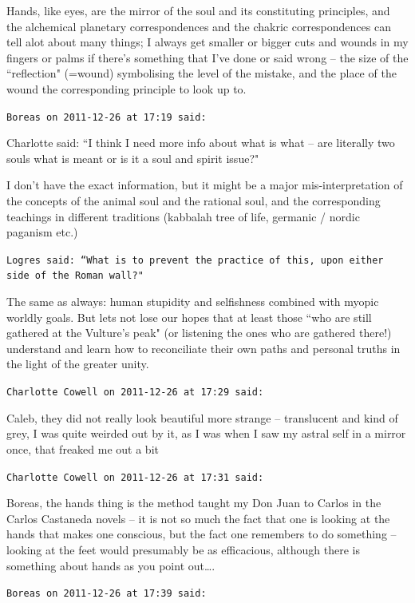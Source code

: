 \begin{footnotesize}
\begin{sffamily}
Hands, like eyes, are the mirror of the soul and its constituting principles, and the alchemical planetary correspondences and the chakric correspondences can tell alot about many things; I always get smaller or bigger cuts and wounds in my fingers or palms if there's something that I've done or said wrong – the size of the ``reflection" (=wound) symbolising the level of the mistake, and the place of the wound the corresponding principle to look up to.


\hfill

\texttt{Boreas on 2011-12-26 at 17:19 said: }

Charlotte said: ``I think I need more info about what is what – are literally two souls what is meant or is it a soul and spirit issue?"

I don't have the exact information, but it might be a major mis-interpretation of the concepts of the animal soul and the rational soul, and the corresponding teachings in different traditions (kabbalah tree of life, germanic / nordic paganism etc.)

\texttt{Logres said: ``What is to prevent the practice of this, upon either side of the Roman wall?"}

The same as always: human stupidity and selfishness combined with myopic worldly goals. But lets not lose our hopes that at least those ``who are still gathered at the Vulture's peak" (or listening the ones who are gathered there!) understand and learn how to reconciliate their own paths and personal truths in the light of the greater unity.


\hfill

\texttt{Charlotte Cowell on 2011-12-26 at 17:29 said: }

Caleb, they did not really look beautiful more strange – translucent and kind of grey, I was quite weirded out by it, as I was when I saw my astral self in a mirror once, that freaked me out a bit


\hfill

\texttt{Charlotte Cowell on 2011-12-26 at 17:31 said: }

Boreas, the hands thing is the method taught my Don Juan to Carlos in the Carlos Castaneda novels – it is not so much the fact that one is looking at the hands that makes one conscious, but the fact one remembers to do something – looking at the feet would presumably be as efficacious, although there is something about hands as you point out….


\hfill

\texttt{Boreas on 2011-12-26 at 17:39 said: }


\end{sffamily}
\end{footnotesize}
